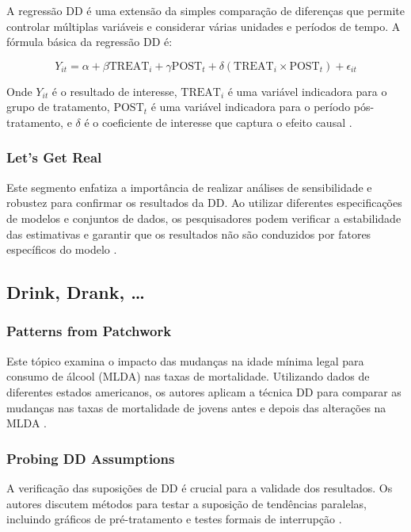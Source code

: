 \documentclass[a4paper,12pt]{article}[abntex2]
\begin{document}
A regressão DD é uma extensão da simples comparação de diferenças que permite controlar múltiplas variáveis e considerar várias unidades e períodos de tempo. A fórmula básica da regressão DD é:

\begin{equation}
    Y_{it} = \alpha + \beta \text{TREAT}_i + \gamma \text{POST}_t + \delta (\text{TREAT}_i \times \text{POST}_t) + \epsilon_{it}
\end{equation}

Onde \(Y_{it}\) é o resultado de interesse, \(\text{TREAT}_i\) é uma variável indicadora para o grupo de tratamento, \(\text{POST}_t\) é uma variável indicadora para o período pós-tratamento, e \(\delta\) é o coeficiente de interesse que captura o efeito causal .

\subsubsection*{Let’s Get Real}

Este segmento enfatiza a importância de realizar análises de sensibilidade e robustez para confirmar os resultados da DD. Ao utilizar diferentes especificações de modelos e conjuntos de dados, os pesquisadores podem verificar a estabilidade das estimativas e garantir que os resultados não são conduzidos por fatores específicos do modelo .

\subsection{Drink, Drank, …}

\subsubsection*{Patterns from Patchwork}

Este tópico examina o impacto das mudanças na idade mínima legal para consumo de álcool (MLDA) nas taxas de mortalidade. Utilizando dados de diferentes estados americanos, os autores aplicam a técnica DD para comparar as mudanças nas taxas de mortalidade de jovens antes e depois das alterações na MLDA .

\subsubsection*{Probing DD Assumptions}

A verificação das suposições de DD é crucial para a validade dos resultados. Os autores discutem métodos para testar a suposição de tendências paralelas, incluindo gráficos de pré-tratamento e testes formais de interrupção  .
\end{document}
